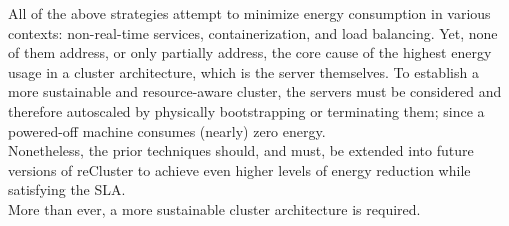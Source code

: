 All of the above strategies attempt to minimize energy consumption in various contexts:
non-real-time services, containerization, and load balancing. Yet, none of them
address, or only partially address, the core cause of the highest energy usage
in a cluster architecture, which is the server themselves. To establish a more
sustainable and resource-aware cluster, the servers must be considered and therefore
autoscaled by physically bootstrapping or terminating them; since a powered-off
machine consumes (nearly) zero energy. \\ %
Nonetheless, the prior techniques should, and must, be extended into future versions
of reCluster to achieve even higher levels of energy reduction while satisfying the
SLA. \\ %
More than ever, a more sustainable cluster architecture is required.